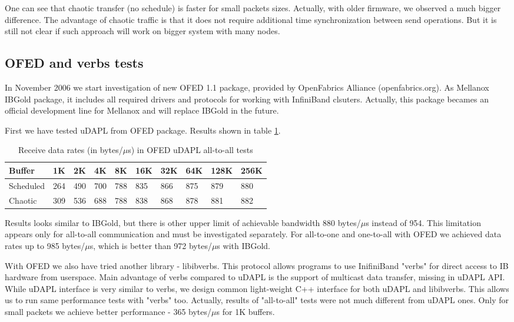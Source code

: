 One can see that chaotic transfer (no schedule) is faster for small packets sizes.
Actually, with older firmware, we observed a much bigger difference.
The advantage of chaotic traffic is that it does not require additional
time synchronization between send operations. But it is still not clear if such
approach will work on bigger system with many nodes.

\subsection{OFED and verbs tests}
In November 2006 we start investigation of new OFED 1.1 package, provided by OpenFabrics Alliance (openfabrics.org). As Mellanox IBGold package, it includes all required drivers and protocols for
working with InfiniBand clsuters. Actually, this package becames an official development line for Mellanox
and will replace IBGold in the future.

First we have tested uDAPL from OFED package. Results shown in table \ref{test-ofeddapl-table}.

\begin{table}[h]
\begin{tabular}{|p{3.0cm}|p{1.0cm}|p{1.0cm}|p{1.0cm}|p{1.0cm}|p{1.0cm}|p{1.0cm}|p{1.0cm}|p{1.0cm}|p{1.0cm}|}      \hline
Buffer & 1K & 2K & 4K & 8K & 16K & 32K & 64K & 128K & 256K \\ \hline
Scheduled & 264 & 490 & 700 & 788 & 835 & 866 & 875 & 879 & 880 \\ \hline
Chaotic & 309 & 536 & 688 & 788 & 838 & 868 & 878 & 881 & 882 \\ \hline
\end{tabular}
\caption{Receive data rates (in bytes/$\mu$s) in OFED uDAPL all-to-all tests}
\label{test-ofeddapl-table}
\end{table}

Results looks similar to IBGold, but there is other upper limit of achievable
bandwidth 880 bytes/$\mu$s instead of 954. This limitation appears only for
all-to-all communication and must be investigated separately. For all-to-one
and one-to-all with OFED we achieved data rates up to 985 bytes/$\mu$s, which
is better than 972 bytes/$\mu$s with IBGold.

With OFED we also have tried another library - libibverbs. This protocol
allows programs to use InifiniBand "verbs" for direct access to IB hardware
from userspace. Main advantage of verbs compared to uDAPL is the support of multicast
data transfer, missing in uDAPL API. While uDAPL interface is very similar to verbs,
we design common light-weight C++ interface for both uDAPL and libibverbs.
This allows us to run same performance tests with "verbs" too.
Actually, results of "all-to-all" tests were not much different from uDAPL ones.
Only for small packets we achieve better performance - 365 bytes/$\mu$s for 1K buffers.

